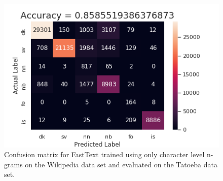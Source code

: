 \begin{figure}
    \centering
    \includegraphics[scale=0.5]{figs/fasttextcharngram}
    \caption{Confusion matrix for FastText trained using only character level n-grams on the Wikipedia data set and evaluated on the Tatoeba data set.}
    \label{fasttextcharngram}
\end{figure}

